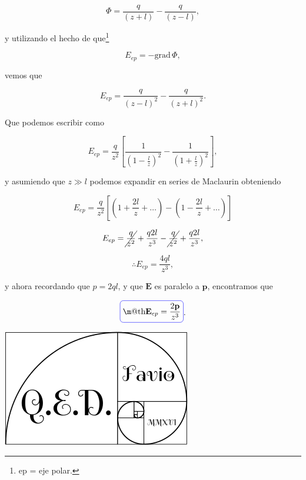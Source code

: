 \documentclass[a4paper,11pt]{article}
\makeatletter
\numberwithin{equation}{section}
\newcommand*{\boxcolor}{blue}
\renewcommand{\boxed}[1]{\textcolor{\boxcolor}{%
\tikz[baseline={([yshift=-1ex]current bounding box.center)}] \node [rectangle, minimum width=1ex,rounded corners,draw] {\normalcolor\m@th$\displaystyle#1$};}}
\makeatother
\begin{document}
\begin{equation}
 \Phi = \frac{q}{(z + l)} - \frac{q}{(z - l)},
\end{equation}

y utilizando el hecho de que\footnote{ep = eje polar.} 

\begin{equation}
 E_{ep} = - \text{grad} \, \Phi,
\end{equation}

vemos que 

\begin{equation}
 E_{ep} = \frac{q}{(z - l)^2} - \frac{q}{(z + l)^2}.
\end{equation}

Que podemos escribir como 

\begin{equation}
 E_{ep} = \frac{q}{z^2}\left[\frac{1}{\left(1 - \frac{l}{z}\right)^2} - 
 \frac{1}{\left(1 + \frac{l}{z}\right)^2}\right],
\end{equation}

y asumiendo que $z \gg l$ podemos expandir en series de Maclaurin obteniendo 

\begin{equation}
 E_{ep} = \frac{q}{z^2}\left[\left(1 + \frac{2l}{z} + \dots \right) - 
 \left(1 - \frac{2l}{z} + \dots \right) \right]
\end{equation}

\begin{equation}
 E_{ep} = \cancel{\frac{q}{z^2}} + \frac{q2l}{z^3} - \cancel{\frac{q}{z^2}} +
 \frac{q2l}{z^3},
\end{equation}

\begin{equation}
 \therefore E_{ep} = \frac{4ql}{z^3},
\end{equation}

y ahora recordando que $p = 2ql$, y que $\mathbf{E}$ es paralelo a $\mathbf{p}$, 
encontramos que 

\begin{equation}
 \boxed{\mathbf{E}_{ep} = \frac{2\mathbf{p}}{z^3}}.
\end{equation}

\hspace{10cm}\includegraphics[scale=0.25]{logoQED}
\end{document}
